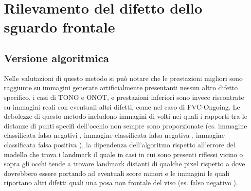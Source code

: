 \documentclass[12pt,a4paper,openright,twoside]{book}
\begin{document}
\section{Rilevamento del difetto dello sguardo frontale}
\subsection{Versione algoritmica}
Nelle valutazioni di questo metodo si può notare che le prestazioni migliori sono raggiunte su immagini generate artificialmente presentanti nessun altro difetto specifico, i casi di TONO e ONOT, e prestazioni inferiori sono invece riscontrate su immagini reali con eventuali altri difetti, come nel caso di FVC-Ongoing. Le debolezze di questo metodo includono immagini di volti nei quali i rapporti tra le distanze di punti specifi dell'occhio non sempre sono proporzionate (es. immagine classificata falsa negativi , immagine classificata falsa negativa , immagine classificata falsa positiva ), la dipendenza dell'algoritmo rispetto all'errore del modello che trova i landmark il quale in casi in cui sono presenti riflessi vicino o sopra gli occhi tende a trovare landmark distanti di qualche pixel rispetto a dove dovrebbero essere portando ad eventuali score minori e le immagini le quali riportano altri difetti quali una posa non frontale del viso (es. falso negativo ).
\end{document}
